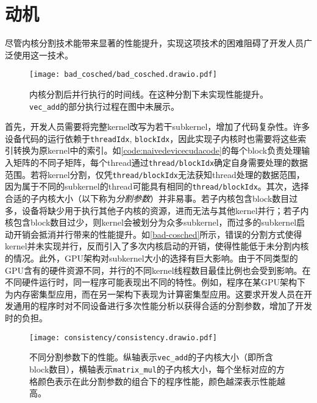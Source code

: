 \chapter{动机}

尽管内核分割技术能带来显著的性能提升，实现这项技术的困难阻碍了开发人员广泛使用这一技术。

\begin{figure}[htbp]
    \centering
    \texttt{[image: bad\_cosched/bad\_cosched.drawio.pdf]}
    \caption{内核分割后并行执行的时间线。在这种分割下未实现性能提升。\texttt{vec\_add}的部分执行过程在图中未展示。}
    \label{bad-cosched}    
\end{figure}

首先，开发人员需要将完整kernel改写为若干subkernel，增加了代码复杂性。许多设备代码的运行依赖于\texttt{threadIdx}, \texttt{blockIdx}，因此实现子内核时也需要将这些索引转换为原kernel中的索引。如\autoref{code:naivedevicecudacode}的每个block负责处理输入矩阵的不同子矩阵，每个thread通过\texttt{thread/blockIdx}确定自身需要处理的数据范围。若将kernel分割，仅凭\texttt{thread/blockIdx}无法获知thread处理的数据范围，因为属于不同的subkernel的thread可能具有相同的\texttt{thread/blockIdx}。其次，选择合适的子内核大小（以下称为\emph{分割参数}）并非易事。若子内核包含block数目过多，设备将缺少用于执行其他子内核的资源，进而无法与其他kernel并行；若子内核包含block数目过少，则kernel会被划分为众多subkernel，而过多的subkernel启动开销会抵消并行带来的性能提升。如\autoref{bad-cosched}所示，错误的分割方式使得kernel并未实现并行，反而引入了多次内核启动的开销，使得性能低于未分割内核的情况。此外，GPU架构对subkernel大小的选择有巨大影响。由于不同类型的GPU含有的硬件资源不同，并行的不同kernel线程数目最佳比例也会受到影响。在不同硬件运行时，同一程序可能表现出不同的特性\cite{10.1145/1498765.1498785}\cite{KONSTANTINIDIS201737}。例如，程序在某GPU架构下为内存密集型应用，而在另一架构下表现为计算密集型应用。这要求开发人员在开发通用的程序时对不同设备进行多次性能分析以获得合适的分割参数，增加了开发时的负担。

\begin{figure}[htbp]
    \centering
    \texttt{[image: consistency/consistency.drawio.pdf]}
    \caption{不同分割参数下的性能。纵轴表示\texttt{vec\_add}的子内核大小（即所含block数目），横轴表示\texttt{matrix\_mul}的子内核大小，每个坐标对应的方格颜色表示在此分割参数的组合下的程序性能，颜色越深表示性能越高。}
    \label{consistency}
\end{figure}

